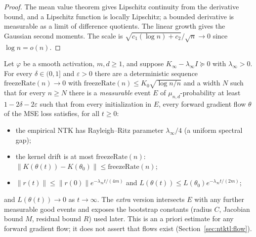 \begin{proof}
  \leanok
The mean value theorem gives Lipschitz continuity from the derivative bound, and a Lipschitz function is locally Lipschitz; a bounded derivative is measurable as a limit of difference quotients. The linear growth gives the Gaussian second moments. The scale is
$\sqrt{c_1(\log n)+c_2}/\sqrt n\to0$ since $\log n=o(n)$.
\end{proof}

\begin{theorem}\label{thm:ntktl:globalEvent}
  \leanok
Let $\varphi$ be a smooth activation, $m,d\ge1$, and suppose $K_\infty-\lambda_\infty I\succeq0$ with $\lambda_\infty>0$. For every $\delta\in(0,1]$ and $\varepsilon>0$ there are a deterministic sequence $\mathrm{freezeRate}(n)\to0$ with $\mathrm{freezeRate}(n)\le K_0\sqrt{\log n/n}$ and a width $N$
such that for every $n\ge N$ there is a \emph{measurable} event $E$ of $\mu_{n,d}$-probability at least $1-2\delta-2\varepsilon$ such that from every initialization in $E$, every forward gradient flow $\theta$ of the MSE loss satisfies, for all $t\ge0$:
\begin{itemize}
  \item the empirical NTK has Rayleigh--Ritz parameter $\lambda_\infty/4$ (a uniform spectral gap);
  \item the kernel drift is at most $\mathrm{freezeRate}(n)$: $\|K(\theta(t))-K(\theta_0)\|\le\mathrm{freezeRate}(n)$;
  \item $\|r(t)\|\le\|r(0)\|e^{-\lambda_\infty t/(4m)}$ and $L(\theta(t))\le L(\theta_0)e^{-\lambda_\infty t/(2m)}$;
\end{itemize}
and $L(\theta(t))\to0$ as $t\to\infty$. The \emph{extra} version intersects $E$ with any further measurable good events and exposes the bootstrap constants (radius $C$, Jacobian bound $M$, residual bound $R$) used later. This is an a priori estimate for any forward gradient flow; it does not assert that flows exist
(Section~\ref{sec:ntktl:flow}).
\end{theorem}

